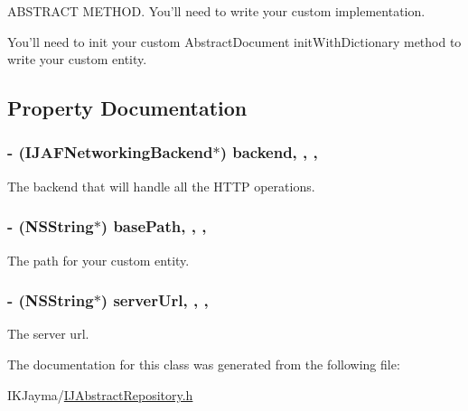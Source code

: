 A\+B\+S\+T\+R\+A\+C\+T M\+E\+T\+H\+O\+D. You'll need to write your custom implementation. 

You'll need to init your custom Abstract\+Document init\+With\+Dictionary method to write your custom entity. 

\subsection{Property Documentation}
\hypertarget{interface_i_j_abstract_repository_a5c1b814ca5af1f13cf8f1ed03f790b3f}{
\subsubsection[{backend}]{\setlength{\rightskip}{0pt plus 5cm}-\/ ({\bf I\+J\+A\+F\+Networking\+Backend}$\ast$) backend\hspace{0.3cm}{\ttfamily [read]}, {\ttfamily [write]}, {\ttfamily [nonatomic]}, {\ttfamily [retain]}}}\label{interface_i_j_abstract_repository_a5c1b814ca5af1f13cf8f1ed03f790b3f}
The backend that will handle all the H\+T\+T\+P operations. \hypertarget{interface_i_j_abstract_repository_ac13521df8d9bce73b5cf3a487e7f6a06}{
\subsubsection[{base\+Path}]{\setlength{\rightskip}{0pt plus 5cm}-\/ (N\+S\+String$\ast$) base\+Path\hspace{0.3cm}{\ttfamily [read]}, {\ttfamily [write]}, {\ttfamily [nonatomic]}, {\ttfamily [retain]}}}\label{interface_i_j_abstract_repository_ac13521df8d9bce73b5cf3a487e7f6a06}
The path for your custom entity. \hypertarget{interface_i_j_abstract_repository_acd6b170c909e14111c45205790afba4e}{
\subsubsection[{server\+Url}]{\setlength{\rightskip}{0pt plus 5cm}-\/ (N\+S\+String$\ast$) server\+Url\hspace{0.3cm}{\ttfamily [read]}, {\ttfamily [write]}, {\ttfamily [nonatomic]}, {\ttfamily [retain]}}}\label{interface_i_j_abstract_repository_acd6b170c909e14111c45205790afba4e}
The server url. 

The documentation for this class was generated from the following file\+:\begin{DoxyCompactItemize}
\item 
I\+K\+Jayma/\hyperlink{_i_j_abstract_repository_8h}{I\+J\+Abstract\+Repository.\+h}\end{DoxyCompactItemize}

